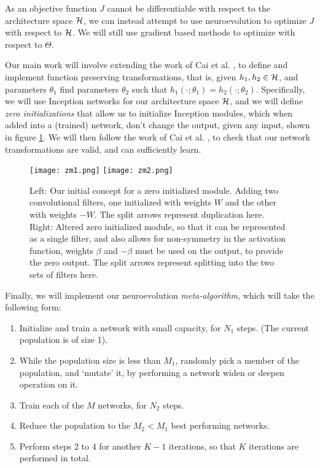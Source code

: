 \documentclass[10pt,letterpaper]{article}
\begin{document}
As an objective function $J$ cannot be differentiable with respect to the architecture space $\mathcal{H}$, we can instead attempt to use neuroevolution to optimize $J$ with respect to $\mathcal{H}$. We will still use gradient based methods to optimize with respect to $\Theta$.

Our main work will involve extending the work of Cai et al. \cite{net2net}, to define and implement function preserving transformations, that is, given $h_1, h_2 \in \mathcal{H}$, and parameters $\theta_1$ find parameters $\theta_2$ such that $h_1(\cdot; \theta_1) = h_2(\cdot; \theta_2)$. Specifically, we will use Inception networks \cite{inception1, inception2, inception3} for our architecture space $\mathcal{H}$, and we will define \textit{zero initializations} that allow us to initialize Inception modules, which when added into a (trained) network, don't change the output, given any input, shown in figure \ref{fig:zero_init_modules}. We will then follow the work of Cai et al. \cite{net2net}, to check that our network transformations are valid, and can sufficiently learn.

\begin{figure}
	\centering
    \texttt{[image: zm1.png]} \hspace{1cm}
    \texttt{[image: zm2.png]} \vspace{1cm}
    \caption{Left: Our initial concept for a zero initialized module. Adding two convolutional filters, one initialized with weights $W$ and the other with weights $-W$. The split arrows represent duplication here. Right: Altered zero initialized module, so that it can be represented as a single filter, and also allows for non-symmetry in the activation function, weights $\beta$ and $-\beta$ must be used on the output, to provide the zero output. The split arrows represent splitting into the two sets of filters here.}
	\label{fig:zero_init_modules}
\end{figure}

Finally, we will implement our neuroevolution \textit{meta-algorithm}, which will take the following form: 
\begin{enumerate}
	\item Initialize and train a network with small capacity, for $N_1$ steps. (The current population is of size 1).
    \item While the population size is less than $M_1$, randomly pick a member of the population, and `mutate' it, by performing a network widen or deepen operation on it.
    \item Train each of the $M$ networks, for $N_2$ steps. 
    \item Reduce the population to the $M_2 < M_1$ best performing networks.
    \item Perform steps 2 to 4 for another $K-1$ iterations, so that $K$ iterations are performed in total.
\end{enumerate}
\end{document}
